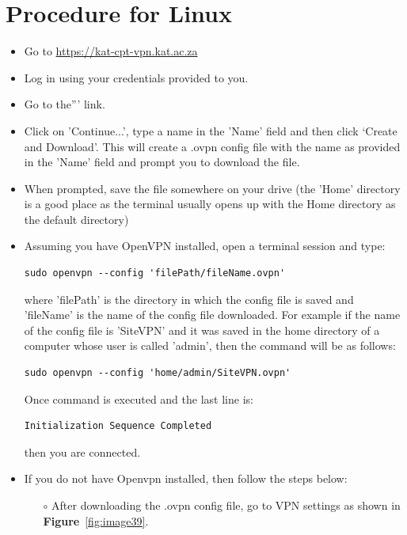 
\section{Procedure for Linux}

\begin{itemize}
	
\item Go to \url{https://kat-cpt-vpn.kat.ac.za}
\item Log in using your credentials provided to you.
\item Go to the''' link.
\item Click on 'Continue...', type a name in the 'Name' field and then click ‘Create and Download’. This will create a .ovpn config file with the name as provided in the 'Name' field and prompt you to download the file.
\item When prompted, save the file somewhere on your drive (the 'Home' directory is a good place as the terminal usually opens up with the Home directory as the default directory)
\item Assuming you have OpenVPN installed, open a terminal session and type:
\begin{lstlisting}[style=DOS]
sudo openvpn --config 'filePath/fileName.ovpn'
\end{lstlisting}

	where 'filePath' is the directory in which the config file is saved and 'fileName' is the       name of the config file downloaded. For example if the name of the config file is 'SiteVPN' and it was saved in the home directory of a computer whose user is called 'admin', then the command will be as follows:
\begin{lstlisting}[style=DOS]
sudo openvpn --config 'home/admin/SiteVPN.ovpn'
\end{lstlisting}

Once command is executed and the last line is:
\begin{lstlisting}[style=DOS]
Initialization Sequence Completed
\end{lstlisting}

	then you are connected.
\item If you do not have Openvpn installed, then follow the steps below:
\begin{itemize}
\item[$\circ$] After downloading the .ovpn config file, go to VPN settings  as shown in \textbf{Figure}~\ref{fig:image39}.


\end{itemize}
\end{itemize}
